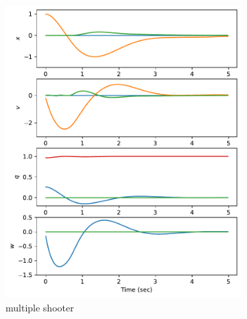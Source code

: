 \documentclass[]{article}
\begin{document}
\begin{figure}[H]
	\centering
	\begin{subfigure}[b]{0.3\textwidth}
		\centering
		\includegraphics[width=\textwidth]{figures/statey115dx3.pdf}
		\caption{multiple shooter}
	\end{subfigure}
	\begin{subfigure}[b]{0.3\textwidth}
		\centering

\end{subfigure}
\end{figure}
\end{document}
